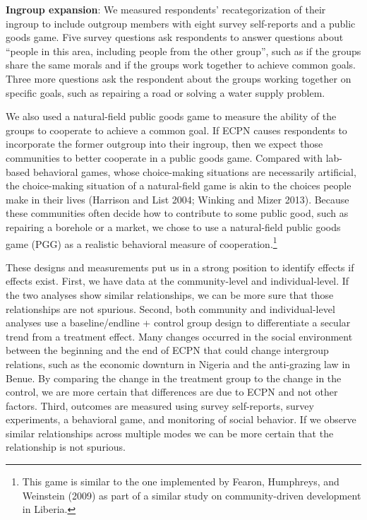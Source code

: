 \documentclass[11pt]{article}
\begin{document}
\textbf{Ingroup expansion}: We measured respondents' recategorization of
their ingroup to include outgroup members with eight survey self-reports
and a public goods game. Five survey questions ask respondents to answer
questions about ``people in this area, including people from the other
group'', such as if the groups share the same morals and if the groups
work together to achieve common goals. Three more questions ask the
respondent about the groups working together on specific goals, such as
repairing a road or solving a water supply problem.

We also used a natural-field public goods game to measure the ability of
the groups to cooperate to achieve a common goal. If ECPN causes
respondents to incorporate the former outgroup into their ingroup, then
we expect those communities to better cooperate in a public goods game.
Compared with lab-based behavioral games, whose choice-making situations
are necessarily artificial, the choice-making situation of a
natural-field game is akin to the choices people make in their lives
(Harrison and List 2004; Winking and Mizer 2013). Because these
communities often decide how to contribute to some public good, such as
repairing a borehole or a market, we chose to use a natural-field public
goods game (PGG) as a realistic behavioral measure of
cooperation.\footnote{This game is similar to the one implemented by
  Fearon, Humphreys, and Weinstein (2009) as part of a similar study on
  community-driven development in Liberia.}

These designs and measurements put us in a strong position to identify
effects if effects exist. First, we have data at the community-level and
individual-level. If the two analyses show similar relationships, we can
be more sure that those relationships are not spurious. Second, both
community and individual-level analyses use a baseline/endline + control
group design to differentiate a secular trend from a treatment effect.
Many changes occurred in the social environment between the beginning
and the end of ECPN that could change intergroup relations, such as the
economic downturn in Nigeria and the anti-grazing law in Benue. By
comparing the change in the treatment group to the change in the
control, we are more certain that differences are due to ECPN and not
other factors. Third, outcomes are measured using survey self-reports,
survey experiments, a behavioral game, and monitoring of social
behavior. If we observe similar relationships across multiple modes we
can be more certain that the relationship is not spurious.
\end{document}
